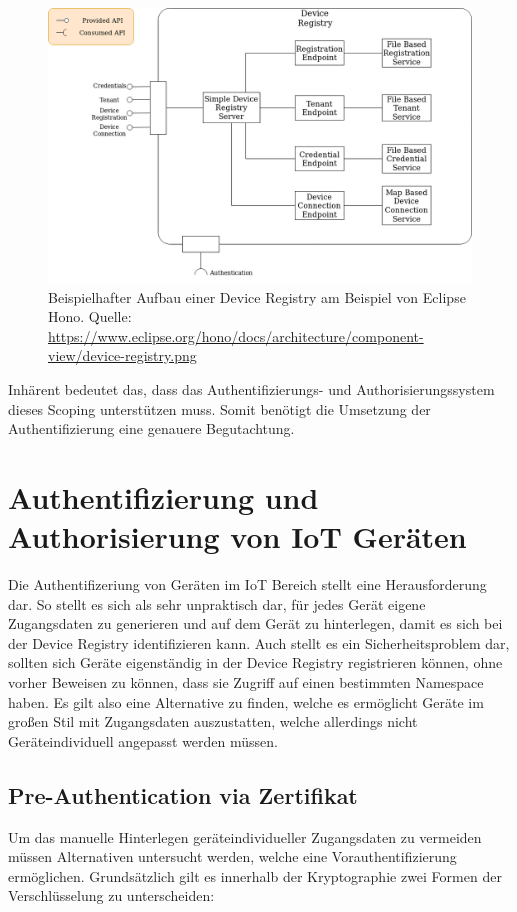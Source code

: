 \begin{figure}
    \centering
    \includegraphics[width=0.75\linewidth]{img/device-registry.png}
    \caption[Bestandteile einer Device Registry]{Beispielhafter Aufbau einer Device Registry am Beispiel von Eclipse Hono. Quelle: \url{https://www.eclipse.org/hono/docs/architecture/component-view/device-registry.png}}
    \label{fig:device_registry}
\end{figure}

Inhärent bedeutet das, dass das Authentifizierungs- und Authorisierungssystem dieses Scoping unterstützen muss. Somit benötigt die Umsetzung der Authentifizierung eine genauere Begutachtung.

\section{Authentifizierung und Authorisierung von IoT Geräten}

Die Authentifizeriung von Geräten im IoT Bereich stellt eine Herausforderung dar. So stellt es sich als sehr unpraktisch dar, für jedes Gerät eigene Zugangsdaten zu generieren und auf dem Gerät zu hinterlegen, damit es sich bei der Device Registry identifizieren kann. Auch stellt es ein Sicherheitsproblem dar, sollten sich Geräte eigenständig in der Device Registry registrieren können, ohne vorher Beweisen zu können, dass sie Zugriff auf einen bestimmten Namespace haben. Es gilt also eine Alternative zu finden, welche es ermöglicht Geräte im großen Stil mit Zugangsdaten auszustatten, welche allerdings nicht Geräteindividuell angepasst werden müssen.

\subsection{Pre-Authentication via Zertifikat}

Um das manuelle Hinterlegen geräteindividueller Zugangsdaten zu vermeiden müssen Alternativen untersucht werden, welche eine Vorauthentifizierung ermöglichen. Grundsätzlich gilt es innerhalb der Kryptographie zwei Formen der Verschlüsselung zu unterscheiden:

